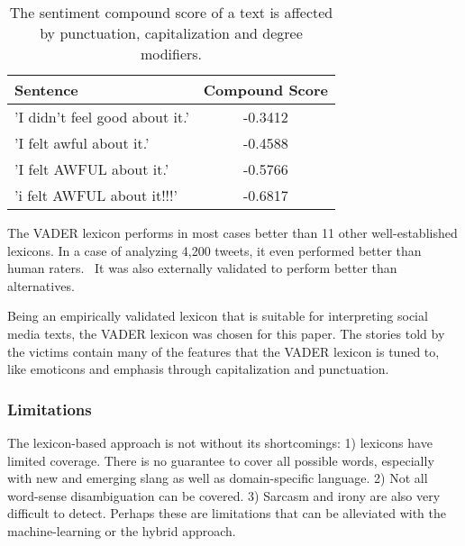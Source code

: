\begin{table}
    \centering
    \begin{tabular}{lc}
        \hline
        \textbf{Sentence} & \textbf{Compound Score} \\ \hline
        'I didn't feel good about it.' & -0.3412  \\
        'I felt awful about it.' & -0.4588 \\ 
        'I felt AWFUL about it.' & -0.5766 \\ 
        'i felt AWFUL about it!!!' & -0.6817 \\ \hline
    \end{tabular}
    \caption{The sentiment compound score of a text is affected by punctuation, capitalization and degree modifiers.}
    \label{tab:sentiment_analysis_heuristics_effects}
\end{table}


The VADER lexicon performs in most cases better than 11 other well-established lexicons. In a case of analyzing 4,200 tweets, it even performed better than human raters.~\cite{hutto2014vader} It was also externally validated to perform better than alternatives.~\cite{al2020evaluating}\cite{min2020comparative}

Being an empirically validated lexicon that is suitable for interpreting social media texts, the VADER lexicon was chosen for this paper. The stories told by the victims contain many of the features that the VADER lexicon is tuned to, like emoticons and emphasis through capitalization and punctuation.

\subsubsection{Limitations}

The lexicon-based approach is not without its shortcomings: 1) lexicons have limited coverage. There is no guarantee to cover all possible words, especially with new and emerging slang as well as domain-specific language. 2) Not all word-sense disambiguation can be covered. 3) Sarcasm and irony are also very difficult to detect. Perhaps these are limitations that can be alleviated with the machine-learning or the hybrid approach.
